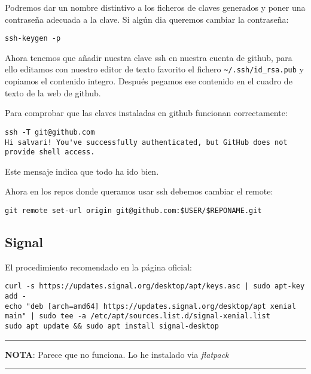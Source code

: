 \documentclass[
  12pt,
  spanish,
]{article}
\begin{document}
Podremos dar un nombre distintivo a los ficheros de claves generados y
poner una contraseña adecuada a la clave. Si algún dia queremos cambiar
la contraseña:

\begin{verbatim}
ssh-keygen -p
\end{verbatim}

Ahora tenemos que añadir nuestra clave ssh en nuestra cuenta de github,
para ello editamos con nuestro editor de texto favorito el fichero
\texttt{\textasciitilde{}/.ssh/id\_rsa.pub} y copiamos el contenido
integro. Después pegamos ese contenido en el cuadro de texto de la web
de github.

Para comprobar que las claves instaladas en github funcionan
correctamente:

\begin{verbatim}
ssh -T git@github.com
Hi salvari! You've successfully authenticated, but GitHub does not provide shell access.
\end{verbatim}

Este mensaje indica que todo ha ido bien.

Ahora en los repos donde queramos usar ssh debemos cambiar el remote:

\begin{verbatim}
git remote set-url origin git@github.com:$USER/$REPONAME.git
\end{verbatim}

\hypertarget{signal}{%
\subsection{Signal}\label{signal}}

El procedimiento recomendado en la página oficial:

\begin{verbatim}
curl -s https://updates.signal.org/desktop/apt/keys.asc | sudo apt-key add -
echo "deb [arch=amd64] https://updates.signal.org/desktop/apt xenial main" | sudo tee -a /etc/apt/sources.list.d/signal-xenial.list
sudo apt update && sudo apt install signal-desktop
\end{verbatim}

\begin{center}\rule{0.5\linewidth}{\linethickness}\end{center}

\textbf{NOTA}: Parece que no funciona. Lo he instalado via
\emph{flatpack}

\begin{center}\rule{0.5\linewidth}{\linethickness}\end{center}
\end{document}
